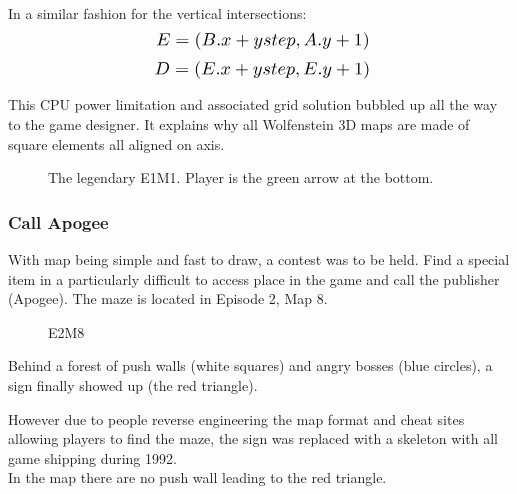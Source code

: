In a similar fashion for the vertical intersections:\\
  \begin{equation*}
    \scalebox{1.3}{

$E = (B.x + ystep, A.y + 1)$\\
}
\end{equation*}
  \begin{equation*}
    \scalebox{1.3}{
$D = (E.x + ystep, E.y + 1)$\\
}
\end{equation*}

This CPU power limitation and associated grid solution bubbled up all the way to the game designer. It explains why all Wolfenstein 3D maps are made of square elements all aligned on axis.\\
\par
\begin{figure}[H]
  \centering
 \caption{The legendary E1M1. Player is the green arrow at the bottom.}
\end{figure}


\subsubsection{Call Apogee}
With map being simple and fast to draw, a contest was to be held. Find a special item in a particularly difficult to access place in the game and call the publisher (Apogee). The maze is located in Episode 2, Map 8.\\
\par
\begin{figure}[H]
  \centering
 \caption{E2M8}
\end{figure}

\par

\begin{minipage}{.5\textwidth}
Behind a forest of push walls (white squares) and angry bosses (blue circles), a sign finally showed up (the red triangle). \\
\par 
However due to people reverse engineering the map format and cheat sites allowing players to find the maze, the sign was replaced with a skeleton with all game shipping during 1992.\\ In the map there are no push wall leading to the red triangle.
 \end{minipage}
\begin{minipage}{.5\textwidth}
\begin{figure}[H]
 \centering
\end{figure}
\end{minipage}


